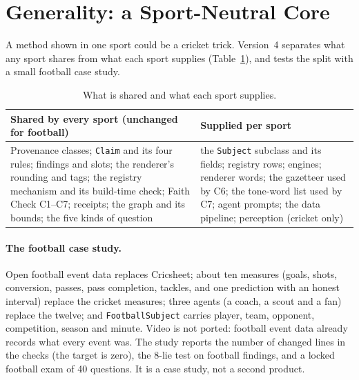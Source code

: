 \documentclass[11pt,a4paper]{article}
\begin{document}
\section{Generality: a Sport-Neutral Core}
\label{sec:general}

A method shown in one sport could be a cricket trick. Version~4 separates what
any sport shares from what each sport supplies (Table~\ref{tab:general}), and
tests the split with a small football case study.

\begin{table}[htbp]
\centering
\footnotesize
\renewcommand{\arraystretch}{1.25}
\begin{tabular}{@{}>{\raggedright\arraybackslash}p{7.6cm}
                  >{\raggedright\arraybackslash}p{7.6cm}@{}}
\toprule
\textbf{Shared by every sport (unchanged for football)} & \textbf{Supplied per sport} \\
\midrule
Provenance classes; \texttt{Claim} and its four rules; findings and slots; the
renderer's rounding and tags; the registry mechanism and its build-time check;
Faith Check C1--C7; receipts; the graph and its bounds; the five kinds of
question &
the \texttt{Subject} subclass and its fields; registry rows; engines; renderer
words; the gazetteer used by C6; the tone-word list used by C7; agent prompts;
the data pipeline; perception (cricket only) \\
\bottomrule
\end{tabular}
\caption{What is shared and what each sport supplies.}
\label{tab:general}
\end{table}

\paragraph{The football case study.} Open football event data \cite{statsbomb}
replaces Cricsheet; about ten measures (goals, shots, conversion, passes, pass
completion, tackles, and one prediction with an honest interval) replace the
cricket measures; three agents (a coach, a scout and a fan) replace the twelve;
and \texttt{FootballSubject} carries player, team, opponent, competition, season
and minute. Video is not ported: football event data already records what every
event was. The study reports the number of changed lines in the checks (the
target is zero), the 8-lie test on football findings, and a locked football exam
of 40 questions. It is a case study, not a second product.
\end{document}
